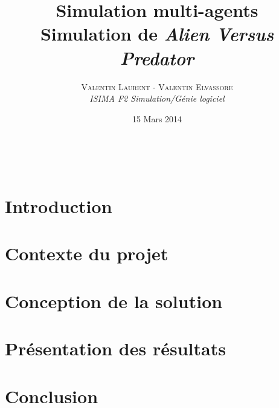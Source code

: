 \documentclass[a4paper, 11pt, ]{article} %
\title{\textbf{Simulation multi-agents}\\
{\Large Simulation de \emph{Alien Versus Predator}}} %
\author{\textsc{Valentin Laurent - Valentin Elvassore} %
\\{\textit{ISIMA F2 Simulation/Génie logiciel}}} %
\date{15 Mars 2014} %
\makeatletter
\renewcommand{\maketitle}{ %
\begin{flushright} %
{\Huge\@title} %

\vspace{50pt} %

{\Large\@author} %
\\\Large\@date %

\vspace{40pt} %
\end{flushright}
}
\makeatother
\begin{document}
\maketitle %


\tableofcontents
\newpage

\section*{Introduction}

\cleardoublepage

\section{Contexte du projet}

\cleardoublepage

\section{Conception de la solution}

\cleardoublepage

\section{Présentation des résultats}

\cleardoublepage

\section*{Conclusion}

\cleardoublepage
\end{document}
